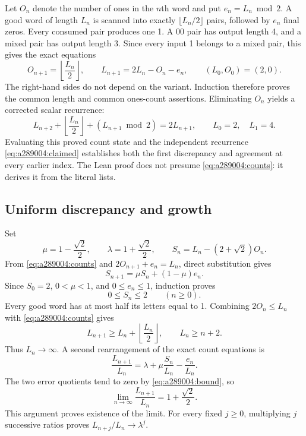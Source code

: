 \documentclass[11pt]{article}
\begin{document}
Let $O_n$ denote the number of ones in the $n$th word and put
$e_n=L_n\bmod2$. A good word of length $L_n$ is scanned into exactly
$\lfloor L_n/2\rfloor$ pairs, followed by $e_n$ final zeros.
Every consumed pair produces one 1. A $00$ pair has output length 4,
and a mixed pair has output length 3. Since every input 1 belongs to
a mixed pair, this gives the exact equations
\begin{equation}
 O_{n+1}=\left\lfloor\frac{L_n}{2}\right\rfloor,
 \qquad
 L_{n+1}=2L_n-O_n-e_n,
 \qquad (L_0,O_0)=(2,0).
 \label{eq:a289004:counts}
\end{equation}
The right-hand sides do not depend on the variant. Induction therefore
proves the common length and common ones-count assertions. Eliminating
$O_n$ yields a corrected scalar recurrence:
\begin{equation}
 L_{n+2}+\left\lfloor\frac{L_n}{2}\right\rfloor
       +(L_{n+1}\bmod2)=2L_{n+1},
 \qquad L_0=2,\quad L_1=4.
 \label{eq:a289004:corrected}
\end{equation}
Evaluating this proved count state and the independent recurrence
\eqref{eq:a289004:claimed} establishes both the first discrepancy and
agreement at every earlier index. The Lean proof does not presume
\eqref{eq:a289004:counts}: it derives it from the literal lists.

\subsection{Uniform discrepancy and growth}

Set
\[
 \mu=1-\frac{\sqrt2}{2},\qquad
 \lambda=1+\frac{\sqrt2}{2},\qquad
 S_n=L_n-(2+\sqrt2)O_n.
\]
From \eqref{eq:a289004:counts} and
$2O_{n+1}+e_n=L_n$, direct substitution gives
\begin{equation}
 S_{n+1}=\mu S_n+(1-\mu)e_n.
 \label{eq:a289004:error}
\end{equation}
Since $S_0=2$, $0<\mu<1$, and $0\le e_n\le1$, induction proves
\begin{equation}
 0\le S_n\le2\qquad(n\ge0).
 \label{eq:a289004:bound}
\end{equation}
Every good word has at most half its letters equal to 1. Combining
$2O_n\le L_n$ with \eqref{eq:a289004:counts} gives
\[
 L_{n+1}\ge L_n+\left\lfloor\frac{L_n}{2}\right\rfloor,
 \qquad L_n\ge n+2.
\]
Thus $L_n\to\infty$. A second rearrangement of the exact count equations is
\begin{equation}
 \frac{L_{n+1}}{L_n}
 =\lambda+\mu\frac{S_n}{L_n}-\frac{e_n}{L_n}.
 \label{eq:a289004:ratio}
\end{equation}
The two error quotients tend to zero by \eqref{eq:a289004:bound}, so
\begin{equation}
 \lim_{n\to\infty}\frac{L_{n+1}}{L_n}
 =1+\frac{\sqrt2}{2}.
 \label{eq:a289004:limit}
\end{equation}
This argument proves existence of the limit. For every fixed
$j\ge0$, multiplying $j$ successive ratios proves
$L_{n+j}/L_n\to\lambda^j$.
\end{document}
